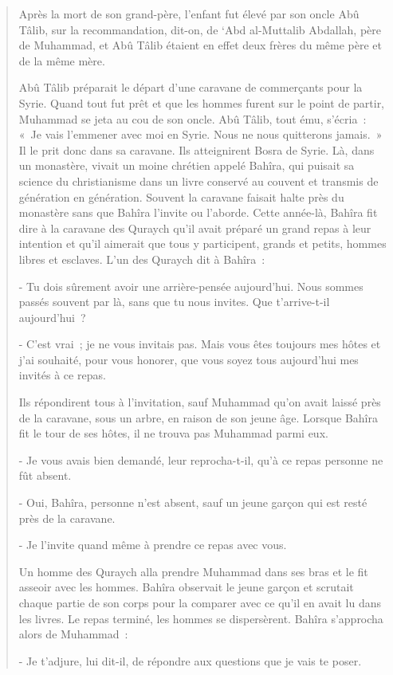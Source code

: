 \begin{quotation}
Après la mort de son grand-père, l'enfant fut élevé par son oncle Abû
Tâlib, sur la recommandation, dit-on, de `Abd al-Muttalib Abdallah, père
de Muhammad, et Abû Tâlib étaient en effet deux frères du même père et
de la même mère.

Abû Tâlib préparait le départ d'une caravane de commerçants pour la
Syrie. Quand tout fut prêt et que les hommes furent sur le point de
partir, Muhammad se jeta au cou de son oncle. Abû Tâlib, tout ému,
s'écria~: «~Je vais l'emmener avec moi en Syrie. Nous ne nous quitterons
jamais.~» Il le prit donc dans sa caravane. Ils atteignirent Bosra de
Syrie. Là, dans un monastère, vivait un moine chrétien appelé Bahîra,
qui puisait sa science du christianisme dans un livre conservé au
couvent et transmis de génération en génération. Souvent la caravane
faisait halte près du monastère sans que Bahîra l'invite ou l'aborde.
Cette année-là, Bahîra fit dire à la caravane des Quraych qu'il avait
préparé un grand repas à leur intention et qu'il aimerait que tous y
participent, grands et petits, hommes libres et esclaves. L'un des
Quraych dit à Bahîra~:

- Tu dois sûrement avoir une arrière-pensée aujourd'hui. Nous sommes
passés souvent par là, sans que tu nous invites. Que t'arrive-t-il
aujourd'hui~?

- C'est vrai~; je ne vous invitais pas. Mais vous êtes toujours mes
hôtes et j'ai souhaité, pour vous honorer, que vous soyez tous
aujourd'hui mes invités à ce repas.

Ils répondirent tous à l'invitation, sauf Muhammad qu'on avait laissé
près de la caravane, sous un arbre, en raison de son jeune âge. Lorsque
Bahîra fit le tour de ses hôtes, il ne trouva pas Muhammad parmi eux.

- Je vous avais bien demandé, leur reprocha-t-il, qu'à ce repas personne
ne fût absent.

- Oui, Bahîra, personne n'est absent, sauf un jeune garçon qui est resté
près de la caravane.

- Je l'invite quand même à prendre ce repas avec vous.

Un homme des Quraych alla prendre Muhammad dans ses bras et le fit
asseoir avec les hommes. Bahîra observait le jeune garçon et scrutait
chaque partie de son corps pour la comparer avec ce qu'il en avait lu
dans les livres. Le repas terminé, les hommes se dispersèrent. Bahîra
s'approcha alors de Muhammad~:

- Je t'adjure, lui dit-il, de répondre aux questions que je vais te
poser.


\end{quotation}
